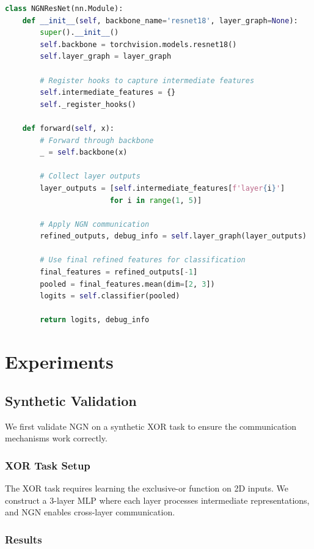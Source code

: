 \documentclass[11pt]{article}
\begin{document}
\begin{lstlisting}[language=Python, caption=NGN Backbone Wrapper]
class NGNResNet(nn.Module):
    def __init__(self, backbone_name='resnet18', layer_graph=None):
        super().__init__()
        self.backbone = torchvision.models.resnet18()
        self.layer_graph = layer_graph

        # Register hooks to capture intermediate features
        self.intermediate_features = {}
        self._register_hooks()

    def forward(self, x):
        # Forward through backbone
        _ = self.backbone(x)

        # Collect layer outputs
        layer_outputs = [self.intermediate_features[f'layer{i}']
                        for i in range(1, 5)]

        # Apply NGN communication
        refined_outputs, debug_info = self.layer_graph(layer_outputs)

        # Use final refined features for classification
        final_features = refined_outputs[-1]
        pooled = final_features.mean(dim=[2, 3])
        logits = self.classifier(pooled)

        return logits, debug_info
\end{lstlisting}

\section{Experiments}

\subsection{Synthetic Validation}

We first validate NGN on a synthetic XOR task to ensure the communication mechanisms work correctly.

\subsubsection{XOR Task Setup}

The XOR task requires learning the exclusive-or function on 2D inputs. We construct a 3-layer MLP where each layer processes intermediate representations, and NGN enables cross-layer communication.

\subsubsection{Results}
\end{document}
